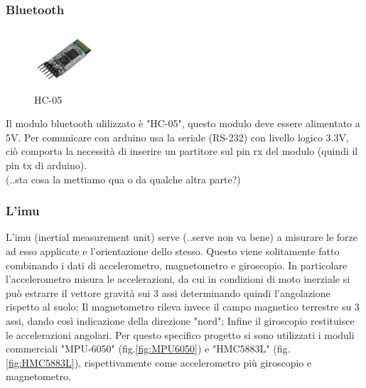 \documentclass[10pt,a4paper]{article}
\begin{document}
\vspace{10pt}

\subsubsection{Bluetooth}
\begin{figure}
	\centering
	\vspace{-30pt}
	\includegraphics[width=0.2\textwidth]{HC-05.jpg}
	\vspace{-30pt}
	\caption{HC-05}
	\label{fig:HC-05}
	\vspace{-30pt}
\end{figure}
Il modulo bluetooth ulilizzato \`e "HC-05", questo modulo deve essere alimentato a 5V. Per comunicare con arduino usa la seriale (RS-232) con livello logico 3.3V, ci\`o comporta la necessit\`a di inserire un partitore sul pin rx del modulo (quindi il pin tx di arduino).
\\
(..sta cosa la mettiamo qua o da qualche altra parte?)

\hfill \break
\hfill \break
\hfill \break


\subsubsection{L'imu}

L'imu (inertial measurement unit) serve (..serve non va bene) a misurare le forze ad esso applicate e l'orientazione dello stesso. Questo viene solitamente fatto combinando i dati di accelerometro, magnetometro e giroscopio. In particolare l'accelerometro misura le accelerazioni, da cui in condizioni di moto inerziale si pu\`o estrarre il vettore gravit\`a sui 3 assi determinando quindi l'angolazione rispetto al suolo; Il magnetometro rileva invece il campo magnetico terrestre su 3 assi, dando cos\`i indicazione della direzione "nord"; Infine il giroscopio restituisce le accelerazioni angolari.
Per questo specifico progetto si sono utilizzati i moduli commerciali "MPU-6050" (fig.\ref{fig:MPU6050}) e "HMC5883L" (fig.\ref{fig:HMC5883L}), rispettivamente come accelerometro pi\`u giroscopio e magnetometro. 
\end{document}
